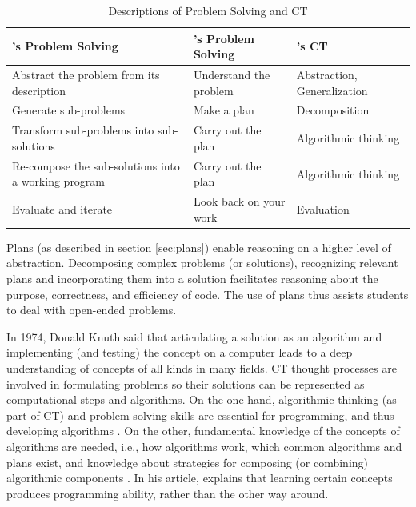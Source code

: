 \begin{table}
  \centering
\begin{tabular}{|p{50mm}|p{45mm}|p{50mm}|}
  \hline
  \textbf{\citeauthor{McCracken2001}'s Problem Solving} & \textbf{\citeauthor{polya2004solve}'s Problem Solving} & \textbf{\cite{selby2013computational}'s CT} \\
  \hline


    Abstract the problem from its description & Understand the problem & Abstraction, Generalization \\ \hline

    Generate sub-problems & Make a plan & Decomposition \\ \hline

    Transform sub-problems into sub-solutions & Carry out the plan & Algorithmic thinking \\ \hline

    Re-compose the sub-solutions into a working program & Carry out the plan & Algorithmic thinking \\ \hline

    Evaluate and iterate & Look back on your work & Evaluation \\ \hline

  \hline
\end{tabular}
\caption{Descriptions of Problem Solving and CT}\label{table:problemSolvingCT}
\end{table}





Plans (as described in section \ref{sec:plans}) enable reasoning on a higher level of abstraction. Decomposing complex problems (or solutions), recognizing relevant plans and incorporating them into a solution facilitates reasoning about the purpose, correctness, and efficiency of code.  The use of plans thus assists students to deal with open-ended problems.

In 1974, Donald Knuth said that articulating a solution as an algorithm and implementing (and testing) the concept on a computer leads to a deep understanding of concepts of all kinds in many fields. CT thought processes are involved in formulating problems so their solutions can be represented as computational steps and algorithms\cite{aho2012computation}. On the one hand, algorithmic thinking (as part of CT) and problem-solving skills are essential for programming, and thus developing algorithms \cite{McCracken2001}. On the other, fundamental knowledge of the concepts of algorithms are needed, i.e., how algorithms work, which common algorithms and plans exist, and knowledge about strategies for composing (or combining) algorithmic components \cite{deRaadt2008}. In his article,  explains that learning certain concepts produces programming ability, rather than the other way around.





